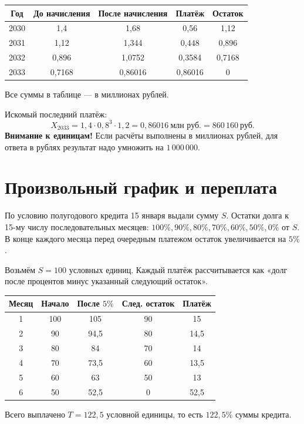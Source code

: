 \documentclass[a4paper,12pt]{article}
\begin{document}
\smallskip
\begin{center}
\small
\begin{tabular}{@{}ccccc@{}}
\toprule
Год & До начисления & После начисления & Платёж & Остаток \\
\midrule
2030 & 1,4 & 1,68 & 0,56 & 1,12 \\
2031 & 1,12 & 1,344 & 0,448 & 0,896 \\
2032 & 0,896 & 1,0752 & 0,3584 & 0,7168 \\
2033 & 0,7168 & 0,86016 & 0,86016 & 0 \\
\bottomrule
\end{tabular}
\end{center}
\begin{center}\footnotesize Все суммы в таблице --- в миллионах рублей.\end{center}

Искомый последний платёж:
\[
X_{2033}=1,4\cdot0,8^3\cdot1,2=0,86016\ \text{млн руб.}
=\boxed{860\,160\ \text{руб.}}
\]
\textbf{Внимание к единицам!} Если расчёты выполнены в миллионах рублей,
для ответа в рублях результат надо умножить на \(1\,000\,000\).

\section{Произвольный график и переплата}
По условию полугодового кредита 15 января выдали сумму \(S\).
Остатки долга к 15-му числу последовательных месяцев:
\(100\%,90\%,80\%,70\%,60\%,50\%,0\%\) от \(S\).
В конце каждого месяца перед очередным платежом остаток увеличивается на \(5\%\).

Возьмём \(S=100\) условных единиц. Каждый платёж рассчитывается как
«долг после процентов минус указанный следующий остаток».
\begin{center}
\small
\begin{tabular}{@{}ccccc@{}}
\toprule
Месяц & Начало & После \(5\%\) & След. остаток & Платёж \\
\midrule
1 & 100 & 105 & 90 & 15 \\
2 & 90 & 94,5 & 80 & 14,5 \\
3 & 80 & 84 & 70 & 14 \\
4 & 70 & 73,5 & 60 & 13,5 \\
5 & 60 & 63 & 50 & 13 \\
6 & 50 & 52,5 & 0 & 52,5 \\
\bottomrule
\end{tabular}
\end{center}
Всего выплачено \(T=122,5\) условной единицы, то есть \(122,5\%\) суммы кредита.
\end{document}
